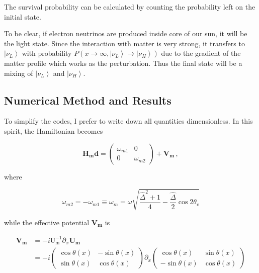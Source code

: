\documentclass{tufte-handout}
\newcommand{\ket}[1]{\left| #1\right\rangle}
\begin{document}
The survival probability can be calculated by counting the probability left on the initial state.

To be clear, if electron neutrinos are produced inside core of our sun, it will be the light state. Since the interaction with matter is very strong, it transfers to $\ket{\nu_L}$ with probability $P(x\to \infty, \ket{\nu_L}\to\ket{\nu_H}) $ due to the gradient of the matter profile which works as the perturbation. Thus the final state will be a mixing of $\ket{\nu_L}$ and $\ket{\nu_H}$.











\subsection{Numerical Method and Results}




To simplify the codes, I prefer to write down all quantities dimensionless. In this spirit, the Hamiltonian becomes

\begin{equation*}
\mathbf{H_md} = \begin{pmatrix}
\omega_{m1} & 0 \\
0 & \omega_{m2}
\end{pmatrix} + \mathbf{V_m} \, ,
\end{equation*}

where 

\begin{equation*}
\omega_{m2} = - \omega_{m1} \equiv \omega_m = \omega \sqrt{\frac{\hat\Delta ^2 + 1}{4} - \frac{\hat\Delta}{2}\cos 2\theta_v }
\end{equation*}

while the effective potential $\mathbf{V_m}$ is

\begin{align*}
\mathbf{V_m} & = - i \mathrm{U_m^{-1}}\partial_x \mathbf{U_m} \\
& = - i \begin{pmatrix} \cos \theta(x) & -\sin\theta(x) \\ \sin\theta(x) & \cos\theta(x) \end{pmatrix} \partial_x \begin{pmatrix} \cos \theta(x) & \sin\theta(x) \\ -\sin\theta(x) & \cos\theta(x) \end{pmatrix} 
\end{align*}
\end{document}
